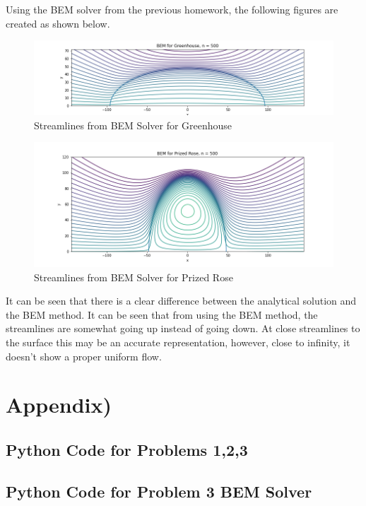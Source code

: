 \documentclass{article}
\begin{document}
		Using the BEM solver from the previous homework, the following figures are created as shown below. 
		
		\begin{figure}[H]
			\centering
			\includegraphics[width=1\textwidth]{images/BEM1.png}
			\caption{ Streamlines from BEM Solver for Greenhouse}
		\end{figure}
	
		\begin{figure}[H]
			\centering
			\includegraphics[width=1\textwidth]{images/BEM2.png}
			\caption{ Streamlines from BEM Solver for Prized Rose}
		\end{figure}
	
		It can be seen that there is a clear difference between the analytical solution and the BEM method. It can be seen that from using the BEM method, the streamlines are somewhat going up instead of going down. At close streamlines to the surface this may be an accurate representation, however, close to infinity, it doesn't show a proper uniform flow. 
		
		\newpage
		\section*{Appendix)}
			\subsection*{ Python Code for Problems 1,2,3 }
			
			\newpage
			\subsection*{ Python Code for Problem 3 BEM Solver }
			
			
			
	
	
\end{document}
